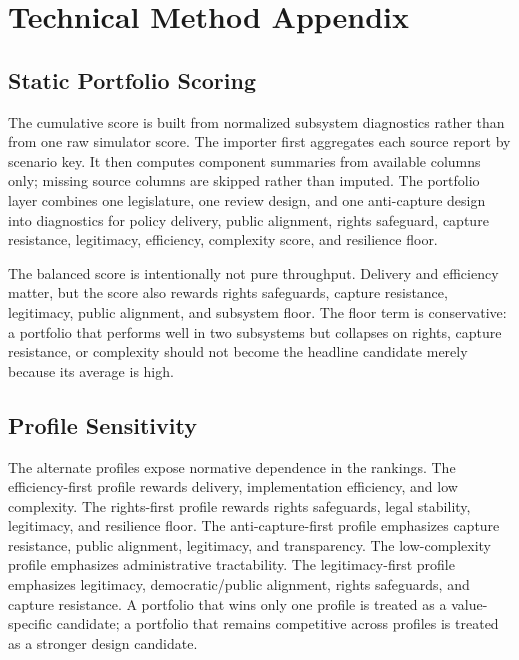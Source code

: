 \documentclass[11pt]{article}
\providecommand{\GeneratedDir}{generated}
\begin{document}
\appendix
\section{Technical Method Appendix}

\subsection{Static Portfolio Scoring}

The cumulative score is built from normalized subsystem diagnostics rather than from one raw simulator score. The importer first aggregates each source report by scenario key. It then computes component summaries from available columns only; missing source columns are skipped rather than imputed. The portfolio layer combines one legislature, one review design, and one anti-capture design into diagnostics for policy delivery, public alignment, rights safeguard, capture resistance, legitimacy, efficiency, complexity score, and resilience floor.

The balanced score is intentionally not pure throughput. Delivery and efficiency matter, but the score also rewards rights safeguards, capture resistance, legitimacy, public alignment, and subsystem floor. The floor term is conservative: a portfolio that performs well in two subsystems but collapses on rights, capture resistance, or complexity should not become the headline candidate merely because its average is high.



\subsection{Profile Sensitivity}

The alternate profiles expose normative dependence in the rankings. The efficiency-first profile rewards delivery, implementation efficiency, and low complexity. The rights-first profile rewards rights safeguards, legal stability, legitimacy, and resilience floor. The anti-capture-first profile emphasizes capture resistance, public alignment, legitimacy, and transparency. The low-complexity profile emphasizes administrative tractability. The legitimacy-first profile emphasizes legitimacy, democratic/public alignment, rights safeguards, and capture resistance. A portfolio that wins only one profile is treated as a value-specific candidate; a portfolio that remains competitive across profiles is treated as a stronger design candidate.
\end{document}
